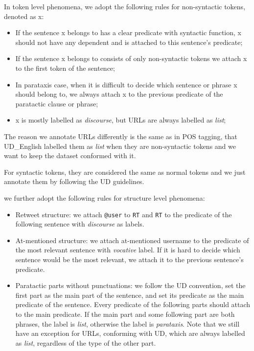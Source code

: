 \documentclass[11pt,letterpaper]{article}
\begin{document}
In token level phenomena, we adopt the following rules for non-syntactic tokens, denoted as x: 

\begin{itemize}
\item If the sentence x belongs to has a clear predicate with syntactic function, x should not have any dependent and is attached to this sentence’s predicate;
\item If the sentence x belongs to consists of only non-syntactic tokens we attach x to the first token of the sentence;
\item In parataxis case, when it is difficult to decide which sentence or phrase x should belong to, we always attach x to the previous predicate of the paratactic clause or phrase;
\item x is mostly labelled as {\it discourse}, but URLs are always labelled as {\it list};
\end{itemize}

The reason we annotate URLs differently is the same as in POS tagging, that UD\_English labelled them as {\it list} when they are non-syntactic tokens and we want to keep the dataset conformed with it.

For syntactic tokens, they are considered the same as normal tokens and we just annotate them by following the UD guidelines.

we further adopt the following rules for structure level phenomena:

\begin{itemize}
\item Retweet structure: we attach {\tt @user} to {\tt RT} and {\tt RT} to the predicate of the following sentence with {\it discourse} as labels.
\item At-mentioned structure: we attach at-mentioned username to the predicate of the most relevant sentence with {\it vocative} label. If it is hard to decide which sentence would be the most relevant, we attach it to the previous sentence's predicate.
\item Paratactic parts without punctuations: we follow the UD convention, set the first part as the main part of the sentence, and set its predicate as the main predicate of the sentence. Every predicate of the following parts should attach to the main predicate. If the main part and some following part are both phrases, the label is {\it list}, otherwise the label is {\it parataxis}. Note that we still have an exception for URLs, conforming with UD, which are always labelled as {\it list}, regardless of the type of the other part.
\end{itemize}
\end{document}
